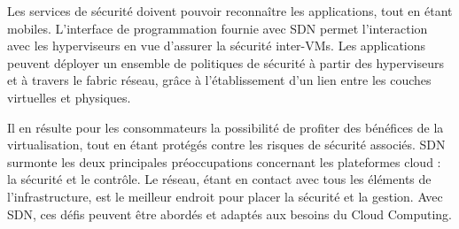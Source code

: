 Les services de sécurité doivent pouvoir reconnaître les applications, tout en étant mobiles. L'interface de programmation fournie avec SDN permet l'interaction avec les hyperviseurs en vue d'assurer la sécurité inter-VMs. Les applications peuvent déployer un ensemble de politiques de sécurité à partir des hyperviseurs et à travers le \gls{fabric} réseau, grâce à l'établissement d'un lien entre les couches virtuelles et physiques. 

Il en résulte pour les consommateurs la possibilité de profiter des bénéfices de la virtualisation, tout en étant protégés contre les risques de sécurité associés. SDN surmonte les deux principales préoccupations concernant les plateformes cloud : la sécurité et le contrôle. Le réseau, étant en contact avec tous les éléments de l'infrastructure, est le meilleur endroit pour placer la sécurité et la gestion. Avec SDN, ces défis peuvent être abordés et adaptés aux besoins du Cloud Computing. \cite{cloudSecurityThreats} \cite{bigSwitchTapModernDC} \cite{zkCloudIntelligentNetwork}

